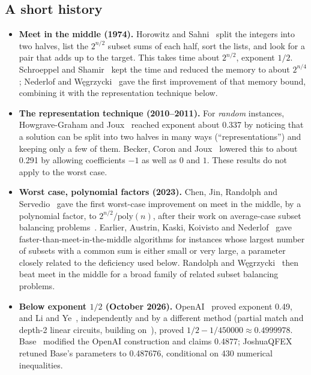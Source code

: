 \documentclass[11pt]{article}
\newcommand{\poly}{\mathrm{poly}}
\theoremstyle{plain}
\begin{document}
\subsection*{A short history}
\begin{itemize}
\item \textbf{Meet in the middle (1974).} Horowitz and Sahni~\cite{hs} split the integers into two halves, list the $2^{n/2}$ subset sums of each half, sort the lists, and look for a pair that adds up to the target. This takes time about $2^{n/2}$, exponent $1/2$. Schroeppel and Shamir~\cite{ss} kept the time and reduced the memory to about $2^{n/4}$; Nederlof and W\k{e}grzycki~\cite{nw} gave the first improvement of that memory bound, combining it with the representation technique below.
\item \textbf{The representation technique (2010--2011).} For \emph{random} instances, Howgrave-Graham and Joux~\cite{hgj} reached exponent about 0.337 by noticing that a solution can be split into two halves in many ways (``representations'') and keeping only a few of them. Becker, Coron and Joux~\cite{bcj} lowered this to about 0.291 by allowing coefficients $-1$ as well as $0$ and $1$. These results do not apply to the worst case.
\item \textbf{Worst case, polynomial factors (2023).} Chen, Jin, Randolph and Servedio~\cite{cjrs23} gave the first worst-case improvement on meet in the middle, by a polynomial factor, to $2^{n/2}/\poly(n)$, after their work on average-case subset balancing problems~\cite{cjrs22}. Earlier, Austrin, Kaski, Koivisto and Nederlof~\cite{akkn} gave faster-than-meet-in-the-middle algorithms for instances whose largest number of subsets with a common sum is either small or very large, a parameter closely related to the deficiency used below. Randolph and W\k{e}grzycki~\cite{rw} then beat meet in the middle for a broad family of related subset balancing problems.
\item \textbf{Below exponent $1/2$ (October 2026).} OpenAI~\cite{openai} proved exponent 0.49, and Li and Ye~\cite{yeli}, independently and by a different method (partial match and depth-2 linear circuits, building on~\cite{rw}), proved $1/2 - 1/450000 \approx 0.4999978$. Base~\cite{base} modified the OpenAI construction and claims 0.4877; JoshuaQFEX~\cite{joshua} retuned Base's parameters to 0.487676, conditional on 430 numerical inequalities.
\end{itemize}
\end{document}
